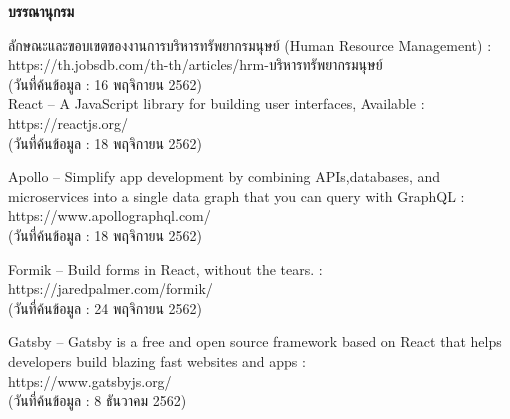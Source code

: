 \begin{center}
      \textbf{\large บรรณานุกรม}
\end{center}
\label{chapter:refernce}

\noindent
[1] ลักษณะและขอบเขตของงานการบริหารทรัพยากรมนุษย์ (Human Resource Management) :
\\
https://th.jobsdb.com/th-th/articles/hrm-บริหารทรัพยากรมนุษย์
\\
(วันที่ค้นข้อมูล : 16 พฤจิกายน 2562)
\\
\break
\noindent
[2] React – A JavaScript library for building user interfaces, Available :
\\
https://reactjs.org/
\\
(วันที่ค้นข้อมูล : 18 พฤจิกายน 2562)
\\
\break

\noindent
[3] Apollo – Simplify app development by combining APIs,databases, and microservices into a single data graph that you can query with GraphQL :
\\
https://www.apollographql.com/
\\
(วันที่ค้นข้อมูล : 18 พฤจิกายน 2562)
\\
\break

\noindent
[4] Formik – Build forms in React, without the tears. :
\\
https://jaredpalmer.com/formik/
\\
(วันที่ค้นข้อมูล : 24 พฤจิกายน 2562)
\\
\break

\noindent
[5] Gatsby – Gatsby is a free and open source framework based on React that helps developers build blazing fast websites and apps :
\\
https://www.gatsbyjs.org/
\\
(วันที่ค้นข้อมูล : 8 ธันวาคม 2562)
\\
\break

